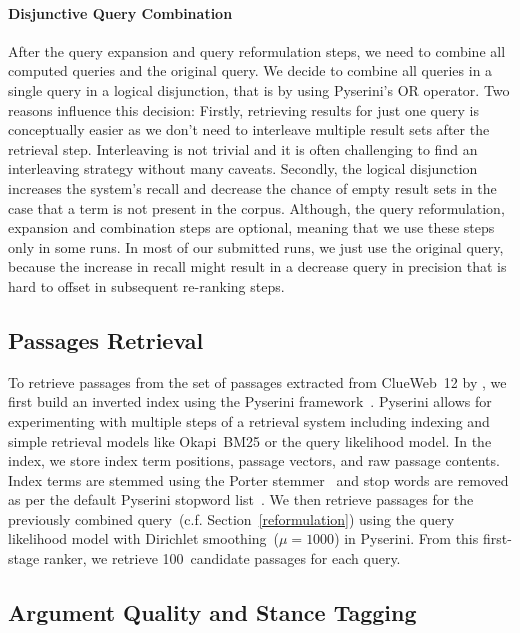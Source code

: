 \paragraph{Disjunctive Query Combination}
After the query expansion and query reformulation steps, we need to combine all computed queries and the original query.
We decide to combine all queries in a single query in a logical disjunction, that is by using Pyserini's OR operator.
Two reasons influence this decision:
Firstly, retrieving results for just one query is conceptually easier as we don't need to interleave multiple result sets after the retrieval step.
Interleaving is not trivial and it is often challenging to find an interleaving strategy without many caveats.
Secondly, the logical disjunction increases the system's recall and decrease the chance of empty result sets in the case that a term is not present in the corpus.
Although, the query reformulation, expansion and combination steps are optional, meaning that we use these steps only in some runs. In most of our submitted runs, we just use the original query, because the increase in recall might result in a decrease query in precision that is hard to offset in subsequent re-ranking steps.

\subsection{Passages Retrieval}\label{retrieval}

To retrieve passages from the set of passages extracted from ClueWeb~12 by \citet{BondarenkoFKSGBPBSWPH2022}, we first build an inverted index using the Pyserini framework~\cite{LinMLYPN2021}.
Pyserini allows for experimenting with multiple steps of a retrieval system including indexing and simple retrieval models like Okapi~BM25 or the query likelihood model.
In the index, we store index term positions, passage vectors, and raw passage contents.
Index terms are stemmed using the Porter stemmer~\cite{Porter1980} and stop words are removed as per the default Pyserini stopword list~\cite{LinMLYPN2021}.
We then retrieve passages for the previously combined query~(c.f. Section~\ref{reformulation}) using the query likelihood model with Dirichlet smoothing~(\( \mu = 1000 \)) in Pyserini.
From this first-stage ranker, we retrieve 100~candidate passages for each query.

\subsection{Argument Quality and Stance Tagging}
\label{argument-tagging}

